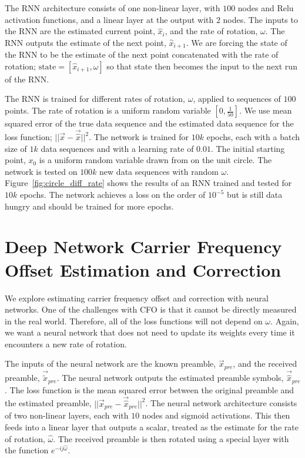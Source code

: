 The RNN architecture consists of one non-linear layer, with $100$ nodes and Relu activation functions, and a linear layer at the output with $2$ nodes. The inputs to the RNN are the estimated current point, $\hat{x}_i$, and the rate of rotation, $\omega$.  The RNN outputs the estimate of the next point, $\hat{x}_{i+1}$.  We are forcing the state of the RNN to be the estimate of the next point concatenated with the rate of rotation; $\text{state} = [\hat{x}_{i+1},\omega]$ so that state then becomes the input to the next run of the RNN.

The RNN is trained for different rates of rotation, $\omega$, applied to sequences of $100$ points.
The rate of rotation is a uniform random variable $[0,\frac{1}{50}]$.
We use mean squared error of the true data sequence and the estimated data sequence for the loss function; $||\vec{x}-\vec{\hat{x}}||^2$.  The network is trained for $10k$ epochs, each with a batch size of $1k$ data sequences and with a learning rate of $0.01$.  The initial starting point, $x_0$ is a uniform random variable drawn from on the unit circle.
The network is tested on $100k$ new data sequences with random $\omega$.
Figure~\ref{fig:circle_diff_rate} shows the results of an RNN trained and tested for $10k$ epochs.  The network achieves a loss on the order of $10^{-5}$ but is still data hungry and should be trained for more epochs.


\section{Deep Network Carrier Frequency Offset Estimation and Correction}

We explore estimating carrier frequency offset and correction with neural networks.
One of the challenges with CFO is that it cannot be directly measured in the real world.  
Therefore, all of the loss functions will not depend on $\omega$.
Again, we want a neural network that does not need to update its weights every time it encounters a new rate of rotation.

The inputs of the neural network are the known preamble, $\vec{x}_{pre}$, and the received preamble, $\vec{\tilde{x}}_{pre}$.  The neural network outputs the estimated preamble symbols, $\vec{\hat{x}}_{pre}$.  
The loss function is the mean squared error between the original preamble and the estimated preamble, $||\vec{x}_{pre}-\vec{\hat{x}}_{pre}||^2$.
The neural network architecture consists of two non-linear layers, each with $10$ nodes and sigmoid activations.  This then feeds into a linear layer that outputs a scalar, treated as the estimate for the rate of rotation, $\hat{\omega}$. 
The received preamble is then rotated using a special layer with the function $e^{-ij\hat{\omega}}$.

